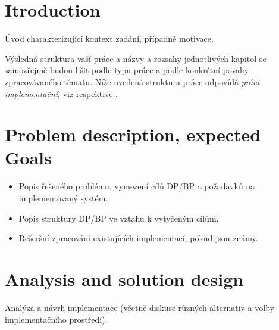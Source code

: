\documentclass[11pt,twoside,a4paper]{book}
\begin{document}
	
	\chapter{Itroduction}
	Úvod charakterizující kontext zadání, případně motivace.
	
	Výsledná struktura vaší práce a názvy a rozsahy jednotlivých kapitol se samozřejmě budou lišit podle typu práce a podle konkrétní povahy zpracovávaného tématu. Níže uvedená struktura práce odpovídá \textit{práci implementační}, viz \cite{infodp} respektive \cite{infobp}. 
	
	
	\chapter{Problem description, expected Goals}
	
	\begin{itemize}
		\item Popis řešeného problému, vymezení cílů DP/BP a požadavků na implementovaný systém.
		\item Popis struktury DP/BP ve vztahu k vytyčeným cílům.
		\item Rešeršní zpracování existujících implementací, pokud jsou známy.
	\end{itemize}
	
	\chapter{Analysis and solution design}
	Analýza a návrh implementace (včetně diskuse různých alternativ a volby implementačního prostředí).
	
\end{document}
